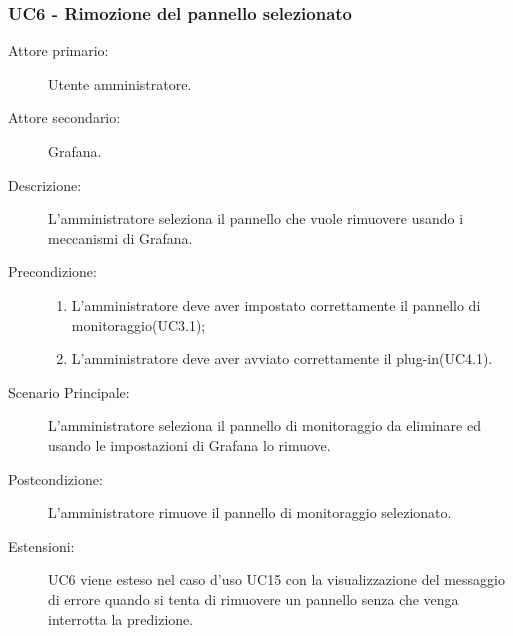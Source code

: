 \subsubsection{UC6 - Rimozione del pannello selezionato}
\label{sssec:uc6}
\begin{description}
	\item[Attore primario:] Utente amministratore.
	\item[Attore secondario:] Grafana.
	\item[Descrizione:] L'amministratore seleziona il pannello che vuole rimuovere usando i meccanismi di Grafana.
	\item[Precondizione:]
	\begin{enumerate}
		\item L'amministratore deve aver impostato correttamente il pannello di monitoraggio(UC3.1);
		\item L'amministratore deve aver avviato correttamente il plug-in(UC4.1).
	\end{enumerate}
	\item[Scenario Principale:] L'amministratore seleziona il pannello di monitoraggio da eliminare ed usando le impostazioni di Grafana lo rimuove.
	\item[Postcondizione:] L'amministratore rimuove il pannello di monitoraggio selezionato.
	\item[Estensioni:] UC6 viene esteso nel caso d'uso UC15 con la visualizzazione del messaggio di errore quando si tenta di rimuovere un pannello senza che venga interrotta la predizione.
\end{description}
